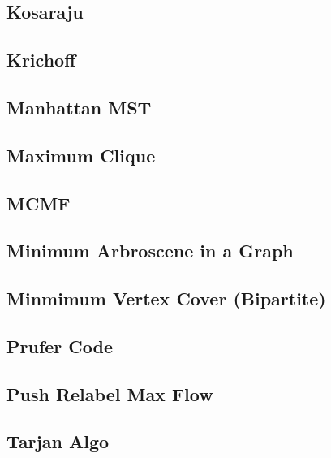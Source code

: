 \subsection{Kosaraju}
\raggedbottom
\hrulefill
\subsection{Krichoff}
\raggedbottom
\hrulefill
\subsection{Manhattan MST}
\raggedbottom
\hrulefill
\subsection{Maximum Clique}
\raggedbottom
\hrulefill
\subsection{MCMF}
\raggedbottom
\hrulefill
\subsection{Minimum Arbroscene in a Graph}
\raggedbottom
\hrulefill
\subsection{Minmimum Vertex Cover (Bipartite)}
\raggedbottom
\hrulefill
\subsection{Prufer Code}
\raggedbottom
\hrulefill
\subsection{Push Relabel Max Flow}
\raggedbottom
\hrulefill
\subsection{Tarjan Algo}
\raggedbottom
\hrulefill
